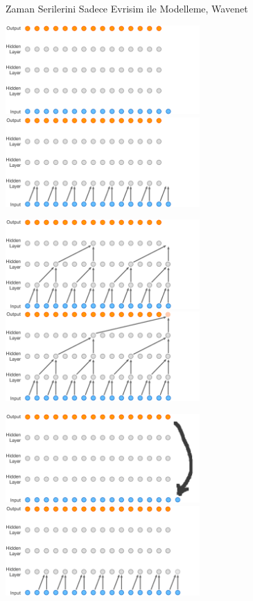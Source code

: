 \documentclass[12pt,fleqn]{article}\usepackage{../../common}
\begin{document}
Zaman Serilerini Sadece Evrisim ile Modelleme, Wavenet 

\includegraphics[width=20em]{wave-000.png}
\includegraphics[width=20em]{wave-010.png}

\vspace{3em}

\includegraphics[width=20em]{wave-040.png}
\includegraphics[width=20em]{wave-058.png}

\vspace{3em}

\includegraphics[width=20em]{wave-089.png}
\includegraphics[width=20em]{wave-104.png}
\end{document}
